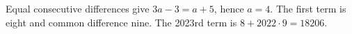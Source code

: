 Equal consecutive differences give $3a-3=a+5$, hence $a=4$. The first term is eight and common difference nine. The 2023rd term is $8+2022\cdot9=\boxed{18206}$.
